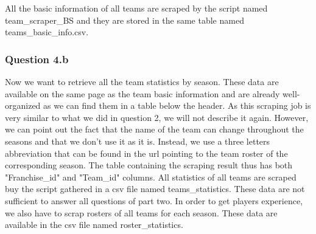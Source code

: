 All the basic information of all teams are scraped by the script named team_scraper_BS and they are stored in the same table named teams_basic_info.csv. 


\subsubsection{Question 4.b}
\label{subsubsec:314b}
Now we want to retrieve all the team statistics by season. These data are available on the same page as the team basic information and are already well-organized as we can find them in a table below the header. As this scraping job is very similar to what we did in question 2, we will not describe it again. However, we can point out the fact that the name of the team can change throughout the seasons and that we don't use it as it is. Instead, we use a three letters abbreviation that can be found in the url pointing to the team roster of the corresponding season. The table containing the scraping result thus has both "Franchise_id" and "Team_id" columns. All statistics of all teams are scraped buy the script gathered in a csv file named teams_statistics.
These data are not sufficient to answer all questions of part two. In order to get players experience, we also have to scrap rosters of all teams for each season. These data are available in the csv file named roster_statistics.
